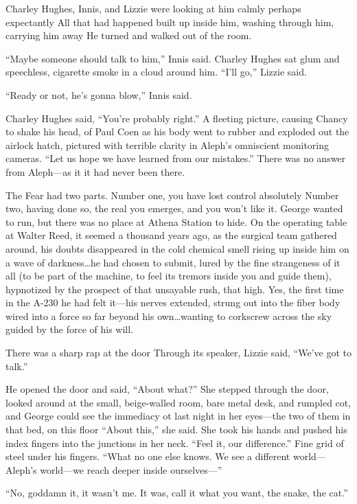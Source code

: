 Charley Hughes, Innis, and Lizzie were looking at him calmly perhaps expectantly All that had happened built up inside him, washing through him, carrying him away He turned and walked out of the room.

``Maybe someone should talk to him,'' Innis said. Charley Hughes sat glum and speechless, cigarette smoke in a cloud around him. ``I'll go,'' Lizzie said.

``Ready or not, he's gonna blow,'' Innis said.

Charley Hughes said, ``You're probably right.'' A fleeting picture, causing Chancy to shake his head, of Paul Coen as his body went to rubber and exploded out the airlock hatch, pictured with terrible clarity in Aleph's omniscient monitoring cameras. ``Let us hope we have learned from our mistakes.''
There was no answer from Aleph—as it it had never been there.

The Fear had two parts. Number one, you have lost control absolutely Number two, having done so, the real you emerges, and you won't like it. George wanted to run, but there was no place at Athena Station to hide. On the operating table at Walter Reed, it seemed a thousand years ago, as the surgical team gathered around, his doubts disappeared in the cold chemical smell rising up inside him on a wave of darkness\ldots he had chosen to submit, lured by the fine strangeness of it all (to be part of the machine, to feel its tremors inside you and guide them), hypnotized by the prospect of that unsayable rush, that high. Yes, the first time in the A-230 he had felt it—his nerves extended, strung out into the fiber body wired into a force so far beyond his own\ldots wanting to corkscrew across the sky guided by the force of his will.

There was a sharp rap at the door Through its speaker, Lizzie said, ``We've got to talk.''

He opened the door and said, ``About what?'' She stepped through the door, looked around at the small, beige-walled room, bare metal desk, and rumpled cot, and George could see the immediacy ot last night in her eyes—the two of them in that bed, on this floor ``About this,'' she said. She took his hands and pushed his index fingers into the junctions in her neck. ``Feel it, our difference.'' Fine grid of steel under his fingers. ``What no one else knows. We see a different world—Aleph's world—we reach deeper inside ourselves—''

``No, goddamn it, it wasn't me. It was, call it what you want, the snake, the cat.''

